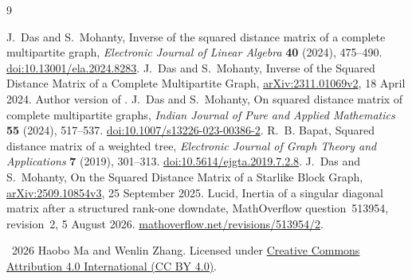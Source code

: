 \documentclass[11pt]{article}
\begin{document}
\begin{thebibliography}{9}
\raggedright
{}
J.~Das and S.~Mohanty,
Inverse of the squared distance matrix of a complete multipartite graph,
\emph{Electronic Journal of Linear Algebra} \textbf{40} (2024), 475--490.
\href{https://doi.org/10.13001/ela.2024.8283}{doi:10.13001/ela.2024.8283}.
J.~Das and S.~Mohanty,
Inverse of the Squared Distance Matrix of a Complete Multipartite Graph,
\href{https://arxiv.org/abs/2311.01069v2}{arXiv:2311.01069v2}, 18 April 2024.
Author version of \cite{DM24}.
J.~Das and S.~Mohanty,
On squared distance matrix of complete multipartite graphs,
\emph{Indian Journal of Pure and Applied Mathematics} \textbf{55} (2024), 517--537.
\href{https://doi.org/10.1007/s13226-023-00386-2}{doi:10.1007/s13226-023-00386-2}.
R.~B. Bapat,
Squared distance matrix of a weighted tree,
\emph{Electronic Journal of Graph Theory and Applications}
\textbf{7} (2019), 301--313.
\href{https://doi.org/10.5614/ejgta.2019.7.2.8}{doi:10.5614/ejgta.2019.7.2.8}.
J.~Das and S.~Mohanty,
On the Squared Distance Matrix of a Starlike Block Graph,
\href{https://arxiv.org/abs/2509.10854v3}{arXiv:2509.10854v3},
25 September 2025.
Lucid,
Inertia of a singular diagonal matrix after a structured rank-one downdate,
MathOverflow question~513954, revision~2, 5 August 2026.
\href{https://mathoverflow.net/revisions/513954/2}{mathoverflow.net/revisions/513954/2}.
\end{thebibliography}

\medskip\noindent\small
\textcopyright\ 2026 Haobo Ma and Wenlin Zhang.
Licensed under \href{https://creativecommons.org/licenses/by/4.0/}{Creative Commons Attribution 4.0 International (CC BY 4.0)}.
\end{document}
